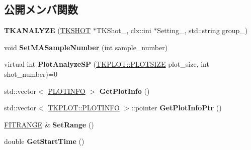 \subsection*{公開メンバ関数}
\begin{DoxyCompactItemize}
\item 
\mbox{\label{class_t_k_a_n_a_l_y_z_e_ac522bb7549f5e2329a8de8de2b2b2d8a}} 
{\bfseries T\+K\+A\+N\+A\+L\+Y\+ZE} (\hyperlink{class_t_k_s_h_o_t}{T\+K\+S\+H\+OT} $\ast$T\+K\+Shot\+\_\+, clx\+::ini $\ast$Setting\+\_\+, std\+::string group\+\_\+)
\item 
\mbox{\label{class_t_k_a_n_a_l_y_z_e_a597c5a215fdb450ba3e169c2487cb3ed}} 
void {\bfseries Set\+M\+A\+Sample\+Number} (int sample\+\_\+number)
\item 
\mbox{\label{class_t_k_a_n_a_l_y_z_e_aae3d430b4ed92bb61177cc8973ff2953}} 
virtual int {\bfseries Plot\+Analyze\+SP} (\hyperlink{class_t_k_p_l_o_t_a158082ae168750554cf23edde9a27416}{T\+K\+P\+L\+O\+T\+::\+P\+L\+O\+T\+S\+I\+ZE} plot\+\_\+size, int shot\+\_\+number)=0
\item 
\mbox{\label{class_t_k_a_n_a_l_y_z_e_abcaf46784a1be43930c1909f5ce122aa}} 
std\+::vector$<$ \hyperlink{class_t_k_p_l_o_t_1_1_p_l_o_t_i_n_f_o}{P\+L\+O\+T\+I\+N\+FO} $>$ {\bfseries Get\+Plot\+Info} ()
\item 
\mbox{\label{class_t_k_a_n_a_l_y_z_e_a7a1898bb5c3959ba18cf4b6cb22557a5}} 
std\+::vector$<$ \hyperlink{class_t_k_p_l_o_t_1_1_p_l_o_t_i_n_f_o}{T\+K\+P\+L\+O\+T\+::\+P\+L\+O\+T\+I\+N\+FO} $>$\+::pointer {\bfseries Get\+Plot\+Info\+Ptr} ()
\item 
\mbox{\label{class_t_k_a_n_a_l_y_z_e_aa3c73c920679675b1a99bf2c0a3dfc1b}} 
\hyperlink{class_t_k_a_n_a_l_y_z_e_1_1_f_i_t_r_a_n_g_e}{F\+I\+T\+R\+A\+N\+GE} \& {\bfseries Set\+Range} ()
\item 
\mbox{\label{class_t_k_a_n_a_l_y_z_e_ac46755c0c97570a8b2f9fee8abe0098a}} 
double {\bfseries Get\+Start\+Time} ()
\item 
\mbox{\label{class_t_k_a_n_a_l_y_z_e_a07e65d7e0e9a7ca58f73432b44541a47}} 

\end{DoxyCompactItemize}
